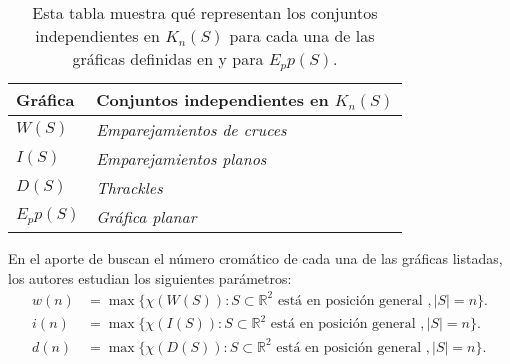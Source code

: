 %
\begin{table}
  \centering
  \begin{tabular}{|l|l|}
    \hline
    Gráfica   & Conjuntos independientes en $K_n(S)$    \\ \hline \hline
    $W(S)$    & \emph{Emparejamientos de cruces}        \\ \hline
    $I(S)$    & \emph{Emparejamientos planos}           \\ \hline
    $D(S)$    & \emph{Thrackles}                        \\ \hline
    $E_pp(S)$ & \emph{Gráfica planar}                   \\ \hline
  \end{tabular}
  \caption{Esta tabla muestra qué representan los conjuntos independientes en $K_n(S)$
  para cada una de las gráficas definidas en \cite{Araujo2005} y para $E_pp(S)$.}
  \label{table:graficasincidencia}
\end{table}
En el aporte de \cite{Araujo2005} buscan el número cromático de cada una de las
gráficas listadas, los autores estudian los siguientes parámetros:
  \begin{align*}
    w(n) &= \max\{\chi(W(S)): S\subset \mathbb{R}^2 \text{ está en posición general }, |S|=n\}. \\
    i(n) &= \max\{\chi(I(S)): S\subset \mathbb{R}^2 \text{ está en posición general }, |S|=n\}. \\
    d(n) &= \max\{\chi(D(S)): S\subset \mathbb{R}^2 \text{ está en posición general }, |S|=n\}. \\
  \end{align*}
